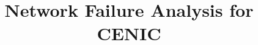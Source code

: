 \documentclass[conference, twocolumn, oneside, 10pt]{IEEEtran}
\begin{document}
%
\title{Network Failure Analysis for CENIC}


\author{
  \IEEEauthorblockN{ }
  \and
  \IEEEauthorblockN{ }
  \and
  \IEEEauthorblockN{ }
}



% 
\end{document}
